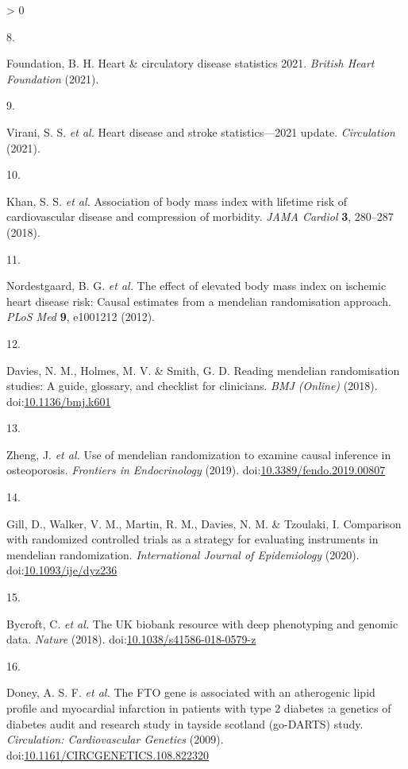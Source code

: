 \documentclass[11pt,twoside]{bristolthesis}
\newlength{\cslhangindent}
\newlength{\csllabelwidth}
\newenvironment{CSLReferences}[2] %
 {%
  \setlength{\parindent}{0pt}
  \ifodd #1 \everypar{\setlength{\hangindent}{\cslhangindent}}\ignorespaces\fi
  \ifnum #2 > 0
  \setlength{\parskip}{#2\baselineskip}
  \fi
 }%
 {}
\newcommand{\CSLLeftMargin}[1]{\parbox[t]{\csllabelwidth}{#1}}
\newcommand{\CSLRightInline}[1]{\parbox[t]{\linewidth - \csllabelwidth}{#1}\break}
\begin{document}
\begin{CSLReferences}{0}{0}
\leavevmode\hypertarget{ref-BritishHeartFoundation2021}{}%
\CSLLeftMargin{8. }
\CSLRightInline{Foundation, B. H. Heart \& circulatory disease statistics 2021. \emph{British Heart Foundation} (2021).}

\leavevmode\hypertarget{ref-Virani2021}{}%
\CSLLeftMargin{9. }
\CSLRightInline{Virani, S. S. \emph{et al.} Heart disease and stroke statistics---2021 update. \emph{Circulation} (2021).}

\leavevmode\hypertarget{ref-Khan2018}{}%
\CSLLeftMargin{10. }
\CSLRightInline{Khan, S. S. \emph{et al.} Association of body mass index with lifetime risk of cardiovascular disease and compression of morbidity. \emph{JAMA Cardiol} \textbf{3}, 280--287 (2018).}

\leavevmode\hypertarget{ref-Nordestgaard2012}{}%
\CSLLeftMargin{11. }
\CSLRightInline{Nordestgaard, B. G. \emph{et al.} The effect of elevated body mass index on ischemic heart disease risk: Causal estimates from a mendelian randomisation approach. \emph{PLoS Med} \textbf{9}, e1001212 (2012).}

\leavevmode\hypertarget{ref-Davies2018}{}%
\CSLLeftMargin{12. }
\CSLRightInline{Davies, N. M., Holmes, M. V. \& Smith, G. D. Reading mendelian randomisation studies: A guide, glossary, and checklist for clinicians. \emph{BMJ (Online)} (2018). doi:\href{https://doi.org/10.1136/bmj.k601}{10.1136/bmj.k601}}

\leavevmode\hypertarget{ref-Zheng2019a}{}%
\CSLLeftMargin{13. }
\CSLRightInline{Zheng, J. \emph{et al.} Use of mendelian randomization to examine causal inference in osteoporosis. \emph{Frontiers in Endocrinology} (2019). doi:\href{https://doi.org/10.3389/fendo.2019.00807}{10.3389/fendo.2019.00807}}

\leavevmode\hypertarget{ref-Gill2020}{}%
\CSLLeftMargin{14. }
\CSLRightInline{Gill, D., Walker, V. M., Martin, R. M., Davies, N. M. \& Tzoulaki, I. Comparison with randomized controlled trials as a strategy for evaluating instruments in mendelian randomization. \emph{International Journal of Epidemiology} (2020). doi:\href{https://doi.org/10.1093/ije/dyz236}{10.1093/ije/dyz236}}

\leavevmode\hypertarget{ref-Bycroft2018}{}%
\CSLLeftMargin{15. }
\CSLRightInline{Bycroft, C. \emph{et al.} The UK biobank resource with deep phenotyping and genomic data. \emph{Nature} (2018). doi:\href{https://doi.org/10.1038/s41586-018-0579-z}{10.1038/s41586-018-0579-z}}

\leavevmode\hypertarget{ref-Doney2009}{}%
\CSLLeftMargin{16. }
\CSLRightInline{Doney, A. S. F. \emph{et al.} The FTO gene is associated with an atherogenic lipid profile and myocardial infarction in patients with type 2 diabetes :a genetics of diabetes audit and research study in tayside scotland (go-DARTS) study. \emph{Circulation: Cardiovascular Genetics} (2009). doi:\href{https://doi.org/10.1161/CIRCGENETICS.108.822320}{10.1161/CIRCGENETICS.108.822320}}


\end{CSLReferences}
\end{document}
